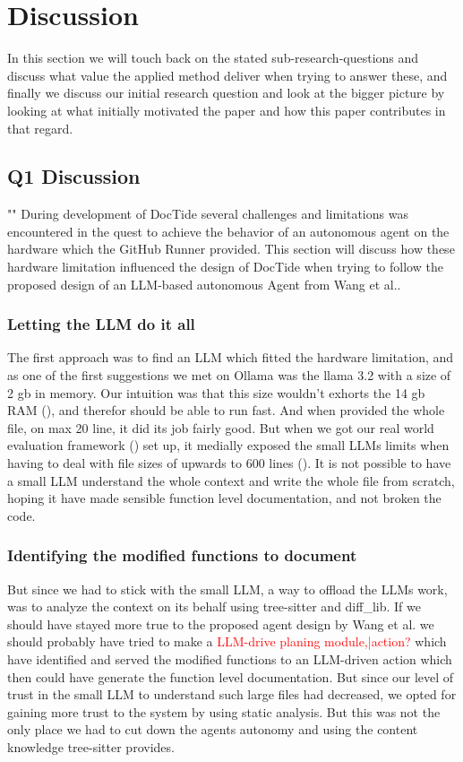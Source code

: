 \section{Discussion}
In this section we will touch back on the stated sub-research-questions and discuss what value the applied method deliver when trying to answer these, and finally we discuss our initial research question and look at the bigger picture by looking at what initially motivated the paper and how this paper contributes in that regard.
\subsection{Q1 Discussion}
\label{sec:DiscussionQ1}
"\textit{\subquestionI}"
During development of DocTide several challenges and limitations was encountered in the quest to achieve the behavior of an autonomous agent on the hardware which the GitHub Runner provided. This section will discuss how these hardware limitation influenced the design of DocTide when trying to follow the proposed design of an LLM-based autonomous Agent from Wang et al.\cite{wang2024survey}.
\subsubsection*{Letting the LLM do it all}
The first approach was to find an LLM which fitted the hardware limitation, and as one of the first suggestions we met on Ollama was the llama 3.2 with a size of 2 gb in memory. Our intuition was that this size wouldn't exhorts the 14 gb RAM (), and therefor should be able to run fast. And when provided the whole file, on max 20 line, it did its job fairly good. But when we got our real world evaluation framework () set up, it medially exposed the small LLMs limits when having to deal with file sizes of upwards to 600 lines (). It is not possible to have a small LLM understand the whole context and write the whole file from scratch, hoping it have made sensible function level documentation, and not broken the code. 
\subsubsection*{Identifying the modified functions to document}
But since we had to stick with the small LLM, a way to offload the LLMs work, was to analyze the context on its behalf using tree-sitter and diff\_lib. If we should have stayed more true to the proposed agent design by Wang et al.\cite{wang2024survey} we should probably have tried to make a \textcolor{red}{LLM-drive planing module,|action?} which have identified and served the modified functions to an LLM-driven action which then could have generate the function level documentation. But since our level of trust in the small LLM to understand such large files had decreased, we opted for gaining more trust to the system by using static analysis. But this was not the only place we had to cut down the agents autonomy and using the content knowledge tree-sitter provides.
